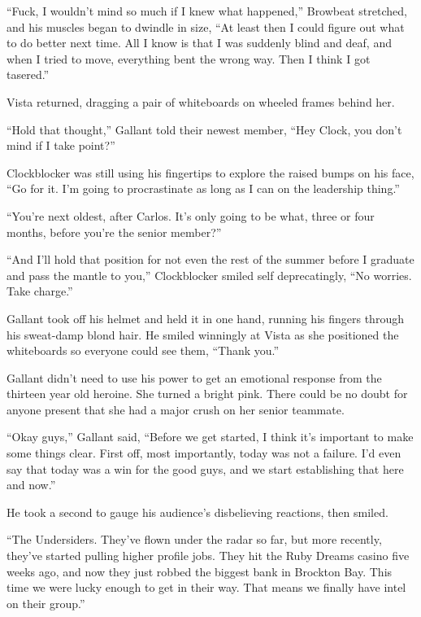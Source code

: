 ``Fuck, I wouldn't mind so much if I knew what happened,'' Browbeat stretched, and his muscles began to dwindle in size, ``At least then I could figure out what to do better next time.  All I know is that I was suddenly blind and deaf, and when I tried to move, everything bent the wrong way.  Then I think I got tasered.''



Vista returned, dragging a pair of whiteboards on wheeled frames behind her.



``Hold that thought,'' Gallant told their newest member, ``Hey Clock, you don't mind if I take point?''



Clockblocker was still using his fingertips to explore the raised bumps on his face, ``Go for it.  I'm going to procrastinate as long as I can on the leadership thing.''



``You're next oldest, after Carlos.  It's only going to be what, three or four months, before you're the senior member?''



``And I'll hold that position for not even the rest of the summer before I graduate and pass the mantle to you,'' Clockblocker smiled self deprecatingly, ``No worries.  Take charge.''



Gallant took off his helmet and held it in one hand, running his fingers through his sweat-damp blond hair.  He smiled winningly at Vista as she positioned the whiteboards so everyone could see them, ``Thank you.''



Gallant didn't need to use his power to get an emotional response from the thirteen year old heroine.  She turned a bright pink.  There could be no doubt for anyone present that she had a major crush on her senior teammate.



``Okay guys,'' Gallant said, ``Before we get started, I think it's important to make some things clear.  First off, most importantly, today was not a failure.  I'd even say that today was a win for the good guys, and we start establishing that here and now.''



He took a second to gauge his audience's disbelieving reactions, then smiled.



``The Undersiders.  They've flown under the radar so far, but more recently, they've started pulling higher profile jobs.  They hit the Ruby Dreams casino five weeks ago, and now they just robbed the biggest bank in Brockton Bay.  This time we were lucky enough to get in their way.  That means we finally have intel on their group.''



